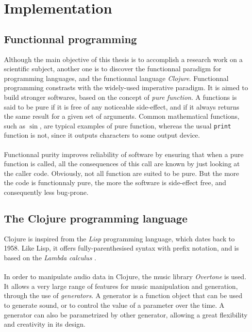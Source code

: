\documentclass[letterpaper]{article}
\newcommand*{\codeinl}{\texttt}
\theoremstyle{definition}
\theoremstyle{remark}
\theoremstyle{plain}
\begin{document}
\section{Implementation}

\subsection{Functionnal programming}
Although the main objective of this thesis is to accomplish a research work on a
scientific subject, another one is to discover the functionnal paradigm for
programming languages, and the functionnal language \emph{Clojure}. Functionnal
programming constrasts with the widely-used imperative paradigm. It is aimed to
build stronger softwares, based on the concept of \emph{pure function}. A
functions is said to be pure if it is free of any noticeable side-effect, and if
it always returns the same result for a given set of arguments. Common
mathematical functions, such as \(\sin\), are typical examples of pure function,
whereas the usual \codeinl{print} function is not, since it outputs characters
to some output device.

\paragraph{}
Functionnal purity improves reliability of software by ensuring that when a pure
function is called, all the consequences of this call are known by just looking
at the caller code. Obviously, not all function are suited to be pure. But the
more the code is functionnaly pure, the more the software is side-effect free,
and consequently less bug-prone.

\subsection{The Clojure programming language}
Clojure is inspired from the \emph{Lisp} programming language, which dates back
to 1958. Like Lisp, it offers fully-parenthesised syntax with prefix notation,
and is based on the \emph{Lambda calculus} \citep{Rojas_atutorial}.

\paragraph{}
In order to manipulate audio data in Clojure, the music library \emph{Overtone}
is used. It allows a very large range of features for music manipulation and
generation, through the use of \emph{generators}. A generator is a function
object that can be used to generate sound, or to control the value of a
parameter over the time. A generator can also be parametrized by other
generator, allowing a great flexibility and creativity in its design.
\end{document}
